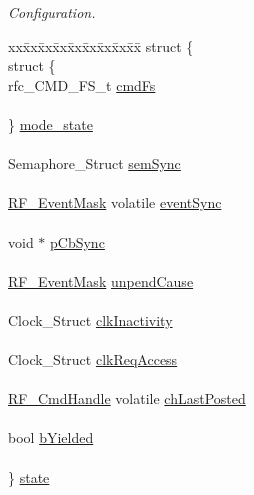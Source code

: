\begin{DoxyCompactItemize}
\begin{tabbing}
\end{tabbing}\begin{DoxyCompactList}\small\item\em Configuration. \end{DoxyCompactList}\item 
\begin{tabbing}
xx\=xx\=xx\=xx\=xx\=xx\=xx\=xx\=xx\=\kill
struct \{\\
\>struct \{\\
\>\>rfc\_CMD\_FS\_t \hyperlink{struct_r_f___object_a48d422eefb97146c830e9b21970bc3a6}{cmdFs}\\
\>\>\\
\>\} \hyperlink{struct_r_f___object_a8201edc4d31d994d0218da2e8a0fcd5b}{mode\_state}\\
\>\>\\
\>Semaphore\_Struct \hyperlink{struct_r_f___object_a2282dfef5c2e04522edfb61f9152628b}{semSync}\\
\>\>\\
\>\hyperlink{_r_f_8h_a128c46e18dbbaa781abb7abafc35233a}{RF\_EventMask} volatile \hyperlink{struct_r_f___object_a8379964e73b8969eb45fe49773eba235}{eventSync}\\
\>\>\\
\>void $\ast$ \hyperlink{struct_r_f___object_ae3219bcfb65bacac26d30af83415863b}{pCbSync}\\
\>\>\\
\>\hyperlink{_r_f_8h_a128c46e18dbbaa781abb7abafc35233a}{RF\_EventMask} \hyperlink{struct_r_f___object_a41528750208c1e201b276509396e0a30}{unpendCause}\\
\>\>\\
\>Clock\_Struct \hyperlink{struct_r_f___object_aaa9b100fc07809bd9086ffc44ebd4225}{clkInactivity}\\
\>\>\\
\>Clock\_Struct \hyperlink{struct_r_f___object_af61760e322c9a76d591bb8b465c9ed37}{clkReqAccess}\\
\>\>\\
\>\hyperlink{_r_f_8h_acab1f56c62a9fd1ad0a91a46b6da23f1}{RF\_CmdHandle} volatile \hyperlink{struct_r_f___object_a855d6435f6532e99b2e6d6e1675212ca}{chLastPosted}\\
\>\>\\
\>bool \hyperlink{struct_r_f___object_a0b8d281afbb2a67d5b238b30fa1f8849}{bYielded}\\
\>\>\\
\} \hyperlink{struct_r_f___object_a2690b9a688416515bafa40617e266c89}{state}\\


\end{tabbing}
\end{DoxyCompactItemize}
